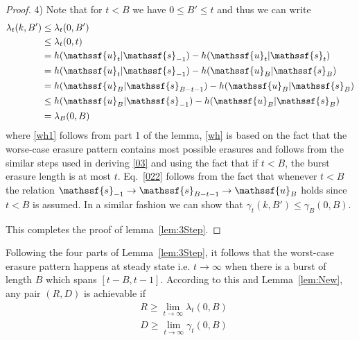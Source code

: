 \documentclass[journal, twocolumn, 10pt]{IEEEtran}
\newcommand{\rvs}{{\mathssf{s}}}    %
\newcommand{\rvu}{{\mathssf{u}}}    %
\begin{document}
\begin{proof}
4) Note that for $t<B$ we have $0\le B' \le t$ and thus we can write 
\begin{align}
\lambda_{t}(k,B') &\le \lambda_{t}(0,B')\label{wh1}\\
&\le \lambda_{t}(0,t) \label{wh}\\
&= h(\rvu_{t} | \rvs_{-1}) -  h(\rvu_{t} | \rvs_{t}) \notag\\
&=h(\rvu_{t} | \rvs_{-1}) -  h(\rvu_{B} | \rvs_{B}) \notag\\
&=h(\rvu_{B} | \rvs_{B-t-1}) -  h(\rvu_{B} | \rvs_{B})\notag\\
& \le  h(\rvu_{B} | \rvs_{-1}) -  h(\rvu_{B} | \rvs_{B}) \label{022}\\
&  =\lambda_{B}(0,B)
\end{align} where \eqref{wh1} follows from part 1 of the lemma, \eqref{wh} is based on the fact that the worse-case erasure pattern contains most possible erasures and follows from the similar steps used in deriving \eqref{03} and using the fact that if $t<B$, the burst erasure length is at most $t$. Eq.~\eqref{022} follows from the fact that whenever $t<B$ the relation $\rvs_{-1}\rightarrow \rvs_{B-t-1} \rightarrow \rvu_B$ holds since $t<B$ is assumed. In a similar fashion we can show that
$\gamma_{t}(k,B') \le \gamma_{B}(0,B)$.

This completes the proof of lemma~\ref{lem:3Step}.
\end{proof}

Following the four parts of Lemma~\ref{lem:3Step}, it follows that the worst-case erasure pattern happens at steady state i.e. $t\to \infty$ when there is a burst of length $B$ which spans $[t-B,t-1]$. According to this and Lemma~\ref{lem:New}, any pair $(R,D)$ is achievable if 
\begin{align}
&R  \ge \lim _{t\to \infty} \lambda_t(0,B)\label{imp1}\\
&D \ge \lim _{t\to \infty} \gamma_t(0,B)\label{imp2} 
\end{align}
\end{document}

